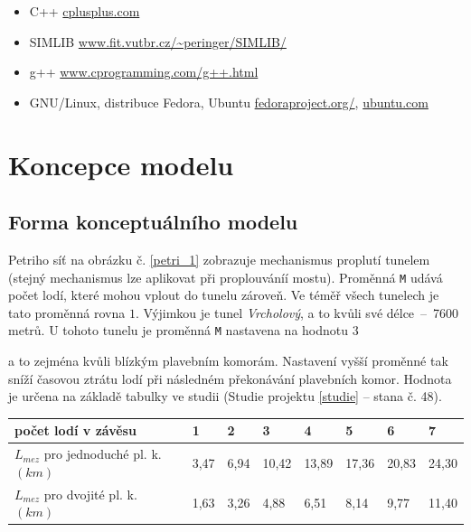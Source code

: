 \documentclass[11pt,a4paper]{article}
\begin{document}
      \begin{itemize}
        \item C++ \href{http://www.cplusplus.com/}{cplusplus.com}
        \item SIMLIB
          \href{http://www.fit.vutbr.cz/~peringer/SIMLIB/}
               {www.fit.vutbr.cz/\textasciitilde peringer/SIMLIB/}
        \item g++ \href{http://www.cprogramming.com/g++.html}
                       {www.cprogramming.com/g++.html}
        \item GNU/Linux, distribuce Fedora, Ubuntu
          \href{http://fedoraproject.org}{fedoraproject.org/},
          \href{http://ubuntu.com}{ubuntu.com}
      \end{itemize}

  \section{Koncepce modelu}

    \subsection{Forma konceptuálního modelu}


      Petriho síť na obrázku č. \ref{petri_1} zobrazuje mechanismus proplutí
      tunelem (stejný mechanismus lze aplikovat při proplouváníí mostu).
      Proměnná \texttt{M} udává počet lodí, které mohou vplout do tunelu zároveň.
      Ve téměř všech tunelech je tato proměnná rovna $1$. Výjimkou je tunel
      \textit{Vrcholový}, a to kvůli své délce \,--\, 7600 metrů. U tohoto
      tunelu je proměnná \texttt{M} nastavena na hodnotu $3$
      
      a to zejména kvůli blízkým plavebním komorám. Nastavení vyšší proměnné
      tak sníží časovou ztrátu lodí při následném překonávání plavebních komor.
      Hodnota je určena na základě tabulky ve
      studii (Studie projektu \ref{studie} -- stana č. 48).

      \begin{center}
        \begin{tabular}{| l | l | l | l | l | l | l | l |}
          \hline
          počet lodí v závěsu & 1 & 2 & 3 & 4 & 5 & 6 & 7 \\ \hline
          $L_{mez}$ pro jednoduché pl. k. $(km)$
            & 3,47 & 6,94 & 10,42 & 13,89 & 17,36 & 20,83 & 24,30 \\ \hline
          $L_{mez}$ pro dvojité pl. k. $(km)$
            & 1,63 & 3,26 &  4,88 &  6,51 &  8,14 &  9,77 & 11,40 \\ \hline
          \end{tabular}
      \end{center}
\end{document}
